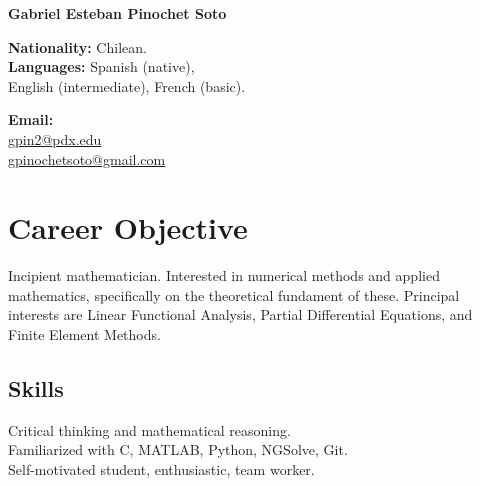 \documentclass[12pt,letterpaper]{report}
\newcommand{\myname}{Gabriel Esteban Pinochet Soto}
\newcommand{\namefont}[1]{{\normalfont\bfseries\Huge{#1}}}
\begin{document}
    \raggedright{}

    \namefont{\myname}

    \vspace{1em}
    \begin{minipage}[t]{0.55\textwidth}
        {\bf Nationality:} Chilean.\\
        {\bf Languages:} Spanish (native), \\English (intermediate), French (basic). \\
    \end{minipage}
    \begin{minipage}[t]{0.4\textwidth}
        {\bf Email:}\\
        \href{mailto:gpin2@pdx.edu}{gpin2@pdx.edu}\\
        \href{mailto:gpinochetsoto@gmail.com}{gpinochetsoto@gmail.com}\\
    \end{minipage}


    \section*{Career Objective}

    Incipient mathematician.
    Interested in numerical methods and applied mathematics, specifically on the theoretical fundament of these.
    Principal interests are Linear Functional Analysis, Partial Differential Equations, and Finite Element Methods.

    \subsection*{Skills}

    Critical thinking and mathematical reasoning.\\
    Familiarized with C, MATLAB, Python, NGSolve, Git.\\
    Self-motivated student, enthusiastic, team worker.

\end{document}
